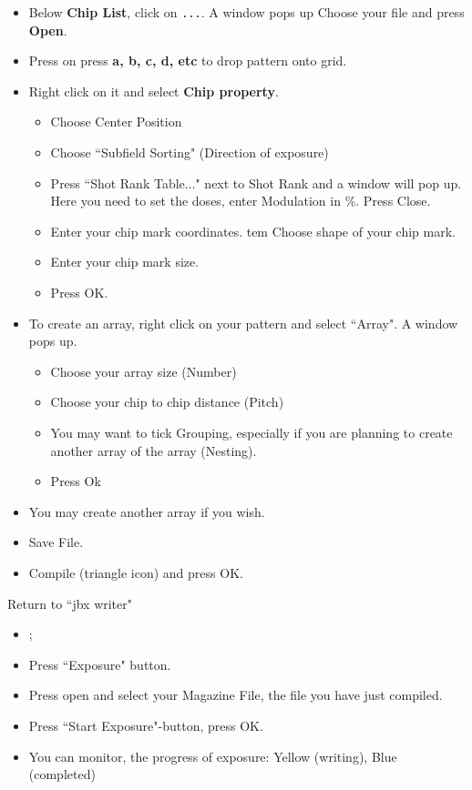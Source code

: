 \begin{itemize}
\item Below  \textbf{Chip List}, click on  \texttt{...}.  A window pops  up \ira
  Choose your file and press \textbf{Open}.
\item Press on press \textbf{a, b, c, d, etc} to drop pattern onto grid.
\item Right click on it and select \textbf{Chip property}.
  \begin{itemize}
  \item Choose Center Position
  \item Choose ``Subfield Sorting" (Direction of exposure)
  \item Press  ``Shot Rank Table..."   next to Shot Rank  and a window  will pop
    up. Here you need to set the doses, enter Modulation in \%. Press Close.
  \item Enter your chip mark coordinates.  tem Choose shape of your chip mark.
  \item Enter your chip mark size.
  \item Press OK.
  \end{itemize}
\item To  create an array,  right click on your  pattern and select  ``Array". A
  window pops up.
  \begin{itemize}
  \item Choose your array size (Number)
  \item Choose your chip to chip distance (Pitch)
  \item You may want to tick Grouping,  especially if you are planning to create
    another array of the array (Nesting).
  \item Press Ok
  \end{itemize}
\item You may create another array if you wish.
\item Save File.
\item Compile (triangle icon) and press OK.
\end{itemize}
Return to ``jbx writer"
\begin{itemize}
\item {};
\item Press ``Exposure" button.
\item Press open and select your Magazine File, the file you have just compiled.
\item Press ``Start Exposure"-button, press OK.
\item  You  can  monitor,  the  progress of  exposure:  Yellow  (writing),  Blue
  (completed)
\end{itemize}

